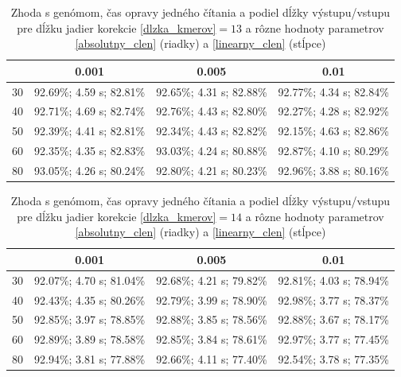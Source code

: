 \begin{table}
    \fontsize{11}{13}\selectfont
    \centering
    \begin{tabular}{ | l || c | c | c | }
    \hline 
& 0.001& 0.005& 0.01 \\ \hline \hline
30 & 92.69\%; 4.59 s; 82.81\% & 92.65\%; 4.31 s; 82.88\% & 92.77\%; 4.34 s; 82.84\% \\ \hline
40 & 92.71\%; 4.69 s; 82.74\% & 92.76\%; 4.43 s; 82.80\% & 92.27\%; 4.28 s; 82.92\% \\ \hline
50 & 92.39\%; 4.41 s; 82.81\% & 92.34\%; 4.43 s; 82.82\% & 92.15\%; 4.63 s; 82.86\% \\ \hline
60 & 92.35\%; 4.35 s; 82.83\% & 93.03\%; 4.24 s; 80.88\% & 92.87\%; 4.10 s; 80.29\% \\ \hline
80 & 93.05\%; 4.26 s; 80.24\% & 92.80\%; 4.21 s; 80.23\% & 92.96\%; 3.88 s; 80.16\% \\ \hline
    \end{tabular}
    \caption{Zhoda s genómom, čas opravy jedného čítania a podiel dĺžky výstupu/vstupu pre dĺžku jadier korekcie \ref{dlzka_kmerov}$ = 13$ a rôzne hodnoty parametrov \ref{absolutny_clen} (riadky) a \ref{linearny_clen} (stĺpce)}
    \label{exp_jadra_k13}
\end{table}

\begin{table}
    \fontsize{11}{13}\selectfont
    \centering
    \begin{tabular}{ | l || c | c | c | }
    \hline 
& 0.001& 0.005& 0.01 \\ \hline \hline
30 & 92.07\%; 4.70 s; 81.04\% & 92.68\%; 4.21 s; 79.82\% & 92.81\%; 4.03 s; 78.94\% \\ \hline
40 & 92.43\%; 4.35 s; 80.26\% & 92.79\%; 3.99 s; 78.90\% & 92.98\%; 3.77 s; 78.37\% \\ \hline
50 & 92.85\%; 3.97 s; 78.85\% & 92.88\%; 3.85 s; 78.56\% & 92.88\%; 3.67 s; 78.17\% \\ \hline
60 & 92.89\%; 3.89 s; 78.58\% & 92.85\%; 3.84 s; 78.61\% & 92.97\%; 3.77 s; 77.45\% \\ \hline
80 & 92.94\%; 3.81 s; 77.88\% & 92.66\%; 4.11 s; 77.40\% & 92.54\%; 3.78 s; 77.35\% \\ \hline
    \end{tabular}
    \caption{Zhoda s genómom, čas opravy jedného čítania a podiel dĺžky výstupu/vstupu pre dĺžku jadier korekcie \ref{dlzka_kmerov}$ = 14$ a rôzne hodnoty parametrov \ref{absolutny_clen} (riadky) a \ref{linearny_clen} (stĺpce)}
    \label{exp_jadra_k14}
\end{table}


